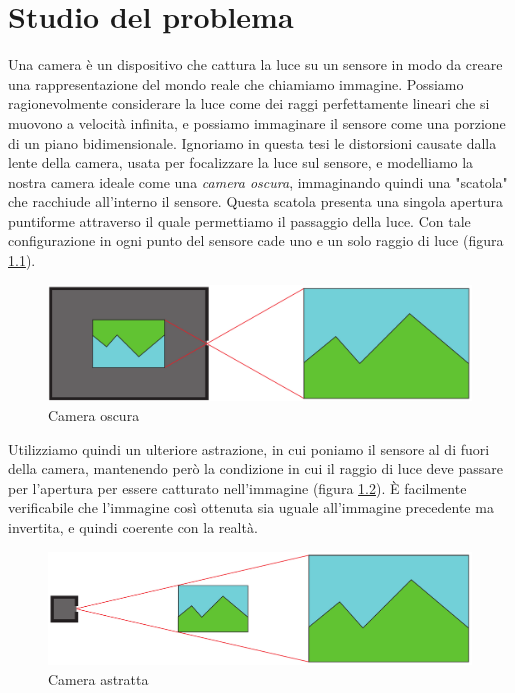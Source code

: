 \chapter{Studio del problema}
\label{sec:teoria}

Una camera è un dispositivo che cattura la luce su un sensore in modo da creare una rappresentazione del mondo reale che chiamiamo immagine.
Possiamo ragionevolmente considerare la luce come dei raggi perfettamente lineari che si muovono a velocità infinita, e possiamo immaginare il sensore come una porzione di un piano bidimensionale.
Ignoriamo in questa tesi le distorsioni causate dalla lente della camera, usata per focalizzare la luce sul sensore, e modelliamo la nostra camera ideale come una \emph{camera oscura}, immaginando quindi una "scatola" che racchiude all'interno il sensore.
Questa scatola presenta una singola apertura puntiforme attraverso il quale permettiamo il passaggio della luce.
Con tale configurazione in ogni punto del sensore cade uno e un solo raggio di luce (figura \ref{fig:camera oscura}).
\begin{figure}
    \caption{Camera oscura}
    \label{fig:camera oscura}
    \centering
    \includegraphics[width=.8\textwidth]{images/camera oscura.pdf}
\end{figure}

Utilizziamo quindi un ulteriore astrazione, in cui poniamo il sensore al di fuori della camera, mantenendo però la condizione in cui il raggio di luce deve passare per l'apertura per essere catturato nell'immagine (figura \ref{fig:camera model}).
È facilmente verificabile che l'immagine così ottenuta sia uguale all'immagine precedente ma invertita, e quindi coerente con la realtà.
\begin{figure}
    \caption{Camera astratta}
    \label{fig:camera model}
    \centering
    \includegraphics[width=.8\textwidth]{images/camera astratta.pdf}
\end{figure}


